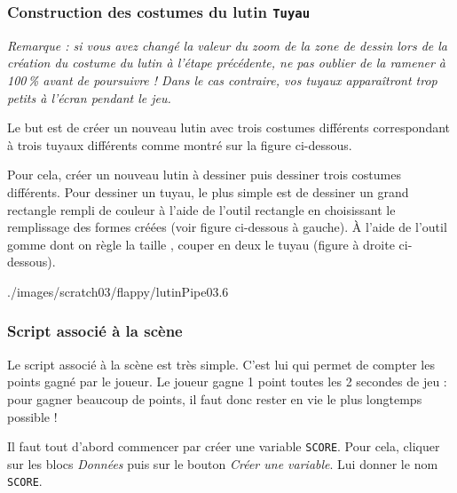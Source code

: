 \subsubsection{Construction des costumes du lutin \texttt{Tuyau}}\label{costumesLutinTuyau} 

\emph{Remarque : si vous avez changé la valeur du zoom de la zone de dessin lors de la création du costume du lutin à l'étape précédente, ne pas oublier de la ramener à 100\,\% avant de poursuivre ! Dans le cas contraire, vos tuyaux apparaîtront trop petits à l'écran pendant le jeu.}

\vspace{6pt}

Le but est de créer un nouveau lutin avec trois costumes différents correspondant à trois tuyaux différents comme montré sur la figure ci-dessous.



Pour cela, créer un nouveau lutin à dessiner puis dessiner trois costumes différents. Pour dessiner un tuyau, le plus simple est de dessiner un grand rectangle rempli de couleur à l'aide de l'outil rectangle  en choisissant le remplissage des formes créées  (voir figure ci-dessous à gauche). À l'aide de l'outil gomme  dont on règle la taille , couper en deux le tuyau (figure à droite ci-dessous).  

%
	      {./images/scratch03/flappy/lutinPipe03}{.6\textwidth}

 





\subsubsection{Script associé à la scène}

Le script associé à la scène est très simple. C'est lui qui permet de compter les points gagné par le joueur. Le joueur gagne 1 point toutes les 2 secondes de jeu : pour gagner beaucoup de points, il faut donc rester en vie le plus longtemps possible !

\vspace{6pt}

Il faut tout d'abord commencer par créer une variable \texttt{SCORE}. Pour cela, cliquer sur les blocs \emph{Données} puis sur le bouton \emph{Créer une variable}. Lui donner le nom \texttt{SCORE}.

